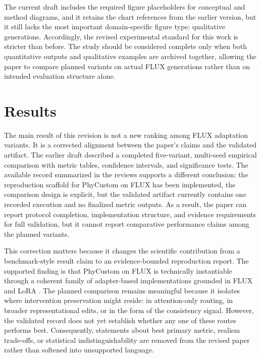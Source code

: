 \documentclass{article}
\begin{document}
The current draft includes the required figure placeholders for conceptual and method diagrams, and it retains the chart references from the earlier version, but it still lacks the most important domain-specific figure type: qualitative generations. Accordingly, the revised experimental standard for this work is stricter than before. The study should be considered complete only when both quantitative outputs and qualitative examples are archived together, allowing the paper to compare planned variants on actual FLUX generations rather than on intended evaluation structure alone.

\section{Results}

The main result of this revision is not a new ranking among FLUX adaptation variants. It is a corrected alignment between the paper's claims and the validated artifact. The earlier draft described a completed five-variant, multi-seed empirical comparison with metric tables, confidence intervals, and significance tests. The available record summarized in the reviews supports a different conclusion: the reproduction scaffold for PhyCustom on FLUX has been implemented, the comparison design is explicit, but the validated artifact currently contains one recorded execution and no finalized metric outputs. As a result, the paper can report protocol completion, implementation structure, and evidence requirements for full validation, but it cannot report comparative performance claims among the planned variants.

This correction matters because it changes the scientific contribution from a benchmark-style result claim to an evidence-bounded reproduction report. The supported finding is that PhyCustom on FLUX is technically instantiable through a coherent family of adapter-based implementations grounded in FLUX and LoRA \cite{blackforestlabs2024fluxdev,hu2021lora}. The planned comparison remains meaningful because it isolates where intervention preservation might reside: in attention-only routing, in broader representational edits, or in the form of the consistency signal. However, the validated record does not yet establish whether any one of these routes performs best. Consequently, statements about best primary metric, realism trade-offs, or statistical indistinguishability are removed from the revised paper rather than softened into unsupported language.
\end{document}
